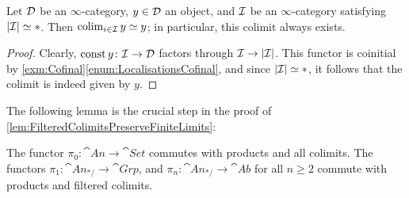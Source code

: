 \begin{lem}\label{lem:ContractibleColimit}
	Let $\mathcal{D}$ be an $\infty$-category, $y\in\mathcal{D}$ an object, and $\mathcal{I}$ be an $\infty$-category satisfying $\abs*{\Ii}\simeq *$. Then $\operatorname*{colim}_{i\in\mathcal{I}} y\simeq y$; in particular, this colimit always exists.
\end{lem}
\begin{proof}
	Clearly, $\operatorname{const} y\colon \mathcal{I}\rightarrow \mathcal{D}$ factors through $\Ii\rightarrow\abs*{\Ii}$. This functor is coinitial by \cref{exm:Cofinal}\cref{enum:LocalisationsCofinal}, and since $ \abs*{\Ii}\simeq *$, it follows that the colimit is indeed given by $y$. 
\end{proof}
The following lemma is the crucial step in the proof of \cref{lem:FilteredColimitsPreserveFiniteLimits}:
\begin{lem}\label{lem:HomotopyGroupsFilteredColimits}
	The functor $\pi_0\colon \cat{An}\rightarrow \cat{Set}$ commutes with products and all colimits. The functors $\pi_1\colon \cat{An}_{*/}\rightarrow\cat{Grp}$, and $\pi_n\colon\cat{An}_{*/}\rightarrow\cat{Ab}$ for all $n\geqslant 2$ commute with products and filtered colimits.
\end{lem}

